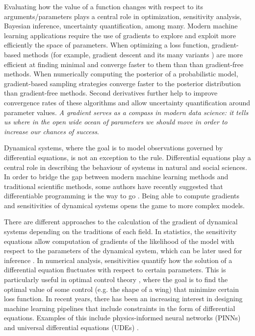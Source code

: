 

Evaluating how the value of a function changes with respect to its arguments/parameters plays a central role in optimization, sensitivity analysis, Bayesian inference, uncertainty quantification, among many. 
Modern machine learning applications require the use of gradients to explore and exploit more efficiently the space of parameters. 
When optimizing a loss function, gradient-based methods (for example, gradient descent and its many variants \cite{ruder2016overview-gradient-descent}) are more efficient at finding minimal and converge faster to them than than gradient-free methods.
When numerically computing the posterior of a probabilistic model, gradient-based sampling strategies converge faster to the posterior distribution than gradient-free methods. 
Second derivatives further help to improve convergence rates of these algorithms and allow uncertainty quantification around parameter values.
\textit{A gradient serves as a compass in modern data science: it tells us where in the open wide ocean of parameters we should move in order to increase our chances of success}.  

Dynamical systems, where the goal is to model observations governed by differential equations, is not an exception to the rule.
Differential equations play a central role in describing the behaviour of systems in natural and social sciences. 
In order to bridge the gap between modern machine learning methods and traditional scientific methods, some authors have recently suggested that differentiable programming is the way to go \cite{Ramsundar_Krishnamurthy_Viswanathan_2021, Shen_diff_modelling}. 
Being able to compute gradients and sensitivities of dynamical systems opens the game to more complex models.

There are different approaches to the calculation of the gradient of dynamical systems depending on the traditions of each field. 
In statistics, the sensitivity equations allow computation of gradients of the likelihood of the model with respect to the parameters of the dynamical system, which can be later used for inference \cite{ramsay2017dynamic}. 
In numerical analysis, sensitivities quantify how the solution of a differential equation fluctuates with respect to certain parameters. 
This is particularly useful in optimal control theory \cite{Giles_Pierce_2000}, where the goal is to find the optimal value of some control (e.g. the shape of a wing) that minimize certain loss function. 
In recent years, there has been an increasing interest in designing machine learning pipelines that include constraints in the form of differential equations. 
Examples of this include physics-informed neural networks (PINNs) \cite{PINNs_2019} and universal differential equations (UDEs) \cite{rackauckas2020universal}.  

